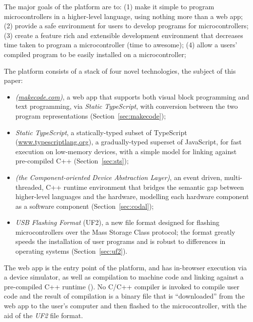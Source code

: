 The major goals of the platform are to:
(1) make it simple to program microcontrollers in a higher-level language,
using nothing more than a web app;
(2) provide a safe environment for users to develop programs for microcontrollers;
(3) create a feature rich and extensible development environment that decreases time taken to program a microcontroller (time to awesome);
(4) allow a users' compiled program to be easily installed on a microcontroller;


The platform consists of a stack of four novel technologies, the subject of
this paper:
\begin{itemize}
\item \emph{\MC (\href{https://makecode.com}{makecode.com})}, a web app that supports both visual block programming and text programming,
via \emph{Static TypeScript}, with conversion between the two program representations (Section~\ref{sec:makecode});

\item \emph{Static TypeScript}, a statically-typed subset of TypeScript (\url{www.typescriptlang.org}),
a gradually-typed superset of JavaScript, for fast execution on low-memory devices, with
a simple model for linking against pre-compiled C++ (Section~\ref{sec:sts});

\item \emph{\CO (the Component-oriented Device Abstraction Layer)}, an event driven, multi-threaded, C++ runtime environment that bridges the semantic gap between higher-level languages and the hardware,
modelling each hardware component as a software component (Section~\ref{sec:codal});

\item \emph{USB Flashing Format} (UF2), a new file format designed for flashing microcontrollers over the Mass Storage
Class protocol; the format greatly speeds the installation of user
programs and is robust to differences in operating systems (Section~\ref{sec:uf2}).
\end{itemize}
The \MC web app is the entry point of the platform, and has in-browser execution via a device simulator, as well as compilation to machine code and linking against a
pre-compiled C++ runtime (\emph{\CON}). No C/C++ compiler is invoked to compile user code and the result of compilation is a binary file that is ``downloaded'' from the web app to the user's
computer and then flashed to the microcontroller, with the aid of the \emph{UF2} file format.


